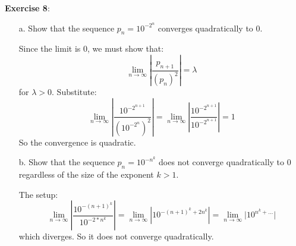 \documentclass{article}
\begin{document}
\textbf{Exercise 8}: 
    \begin{itemize}
        \item [a.] Show that the sequence $p_{n} = 10^{-2^{n}}$ converges quadratically to $0$.
            \begin{answer}
                Since the limit is $0$, we must show that:
                    \begin{equation*}
                        \lim\limits_{n \to \infty} \left\lvert \dfrac{p_{n + 1}}{(p_{n})^{2}} \right\rvert = \lambda
                    \end{equation*}
                for $\lambda > 0$. Substitute:
                    \begin{equation*}
                        \lim\limits_{n \to \infty} \left\lvert \dfrac{10^{-2^{n + 1}}}{(10^{-2^{n}})^{2}} \right\rvert = \lim\limits_{n \to \infty} \left\lvert \dfrac{10^{-2^{n + 1}}}{10^{-2^{n + 1}}} \right\rvert = 1
                    \end{equation*}
                So the convergence is quadratic.
            \end{answer}

        \item [b.] Show that the sequence $p_{n} = 10^{-n^{k}}$ does not converge quadratically to $0$ regardless of the size of the exponent $k > 1$.
            \begin{answer}
                The setup:
                    \begin{equation*}
                        \lim\limits_{n \to \infty} \left\lvert \dfrac{10^{-(n + 1)^{k}}}{10^{-2 * n^{k}}} \right\rvert = \lim\limits_{n \to \infty} \left\lvert 10^{-(n + 1)^{k} + 2n^{k}} \right\rvert = \lim\limits_{n \to \infty}\lvert 10^{n^{k} + \ldots} \rvert
                    \end{equation*}
                which diverges. So it does not converge quadratically.
            \end{answer}
    \end{itemize}
\end{document}
